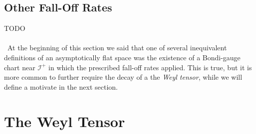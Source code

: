 \documentclass[11pt,letterpaper]{article}
\begin{document}
\subsection{Other Fall-Off Rates}
TODO\\
\\
\
At the beginning of this section we said that one of several inequivalent definitions of an asymptotically flat space was the existence of a Bondi-gauge chart near $\mathcal{I}^+$ in which the prescribed fall-off rates applied. This is true, but it is more common to further require the decay of a the \textit{Weyl tensor}, while we will define a motivate in the next section.

\section{The Weyl Tensor}
\end{document}
